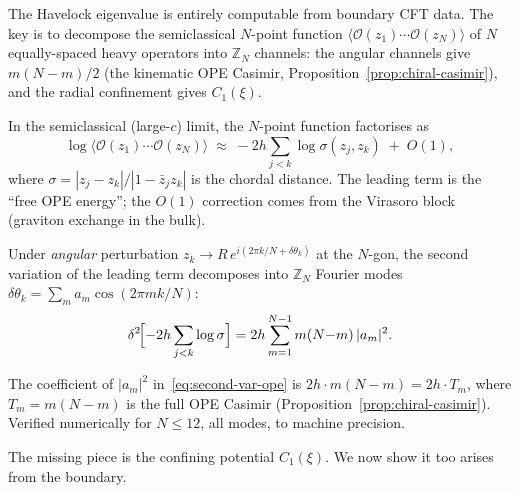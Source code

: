 The Havelock eigenvalue is entirely computable from boundary
CFT data.
The key is to decompose the semiclassical $N$-point function
$\langle\mathcal{O}(z_1)\cdots\mathcal{O}(z_N)\rangle$
of $N$ equally-spaced heavy operators into
$\mathbb{Z}_N$ channels: the angular channels give $m(N{-}m)/2$
(the kinematic OPE Casimir, Proposition~\ref{prop:chiral-casimir}),
and the radial confinement gives $C_1(\xi)$.

In the semiclassical (large-$c$) limit, the $N$-point
function factorises as
\begin{equation}\label{eq:n-point-semiclassical}
  \log\langle\mathcal{O}(z_1)\cdots\mathcal{O}(z_N)\rangle
  \;\approx\;
  -2h \sum_{j<k} \log\sigma(z_j, z_k)
  \;+\; O(1),
\end{equation}
where $\sigma = |z_j{-}z_k|/|1{-}\bar{z}_j z_k|$ is the
chordal distance.
The leading term is the ``free OPE energy''; the $O(1)$
correction comes from the Virasoro block (graviton exchange
in the bulk).

Under \emph{angular} perturbation
$z_k \to R\,e^{i(2\pi k/N + \delta\theta_k)}$ at the $N$-gon,
the second variation of the leading term decomposes into
$\mathbb{Z}_N$ Fourier modes $\delta\theta_k =
\sum_m a_m \cos(2\pi mk/N)$:
\begin{equation}\label{eq:second-var-ope}
  \delta^2\!\Bigl[-2h\sum_{j<k}\log\sigma\Bigr]
  = 2h \sum_{m=1}^{N-1} m(N{-}m)\,|a_m|^2.
\end{equation}

\begin{proposition}
\label{prop:ope-stiffness}
The coefficient of $|a_m|^2$
in~\eqref{eq:second-var-ope} is $2h\cdot m(N{-}m)
= 2h \cdot T_m$, where $T_m = m(N{-}m)$ is the full
OPE Casimir (Proposition~\ref{prop:chiral-casimir}).
Verified numerically for $N \le 12$, all modes, to
machine precision.
\end{proposition}

The missing piece is the confining potential $C_1(\xi)$.
We now show it too arises from the boundary.

